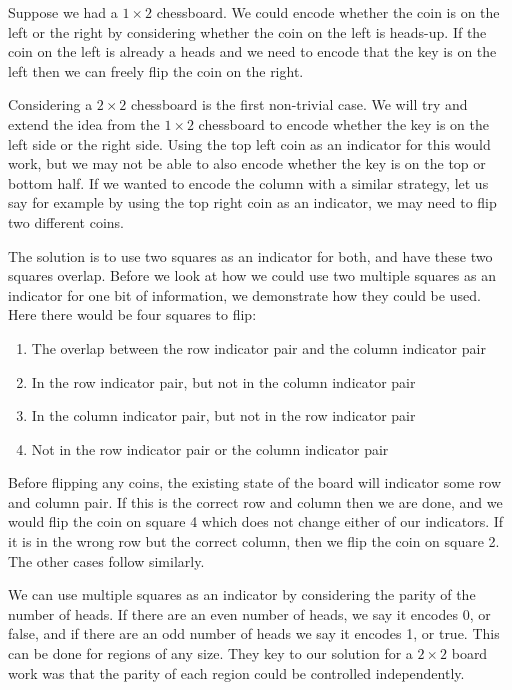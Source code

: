Suppose we had a $1 \times 2$ chessboard. We could encode whether the coin is on the left or the right by considering whether the coin on the left is heads-up. If the coin on the left is already a heads and we need to encode that the key is on the left then we can freely flip the coin on the right.

Considering a $2 \times 2$ chessboard is the first non-trivial case. We will try and extend the idea from the $1 \times 2$ chessboard to encode whether the key is on the left side or the right side. Using the top left coin as an indicator for this would work, but we may not be able to also encode whether the key is on the top or bottom half. If we wanted to encode the column with a similar strategy, let us say for example by using the top right coin as an indicator, we may need to flip two different coins.

The solution is to use two squares as an indicator for both, and have these two squares overlap. Before we look at how we could use two multiple squares as an indicator for one bit of information, we demonstrate how they could be used. Here there would be four squares to flip:

\begin{enumerate}
	\item The overlap between the row indicator pair and the column indicator pair
	\item In the row indicator pair, but not in the column indicator pair
	\item In the column indicator pair, but not in the row indicator pair
	\item Not in the row indicator pair or the column indicator pair
\end{enumerate}

Before flipping any coins, the existing state of the board will indicator some row and column pair. If this is the correct row and column then we are done, and we would flip the coin on square 4 which does not change either of our indicators. If it is in the wrong row but the correct column, then we flip the coin on square 2. The other cases follow similarly.

We can use multiple squares as an indicator by considering the parity of the number of heads. If there are an even number of heads, we say it encodes 0, or false, and if there are an odd number of heads we say it encodes 1, or true. This can be done for regions of any size. They key to our solution for a $2 \times 2$ board work was that the parity of each region could be controlled independently.

